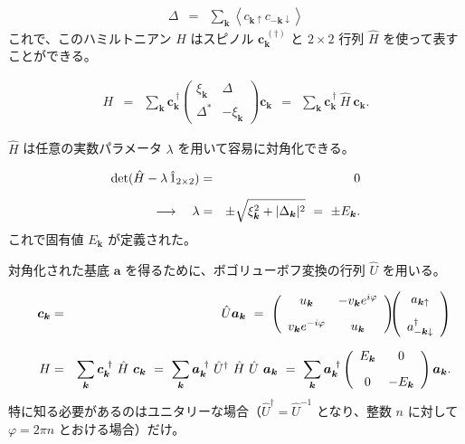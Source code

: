 \documentclass[uplatex,a4j,12pt,dvipdfmx]{jsarticle}
\begin{document}
\begin{eqnarray}
	\Delta
	&=&
	\sum_{\bm{k}}
	\left\langle
	c_{\bm{k} \uparrow}
	c_{-\bm{k} \downarrow}
	\right\rangle
\end{eqnarray}
%
これで、このハミルトニアン $H$ はスピノル $\bm{c}_{\bm{k}}^{\ (\dagger)}$ と $2 \times 2$ 行列 $\hat{H}$ を使って表すことができる。

\begin{eqnarray}
	H
	&=&
	\sum_{\bm{k}}
	\bm{c}^{\ \dagger}_{\bm{k}}
	\!\!
	\left(
	\begin{array}{cc}
			\xi_{\bm{k}} & \Delta         \\[3mm]
			\Delta^{*}    & -\xi_{\bm{k}}
		\end{array}
	\right)
	\!\!
	\bm{c}_{\bm{k}}
	\ \ = \ \
	\sum_{\bm{k}}
	\bm{c}^{\ \dagger}_{\bm{k}}
	\
	\hat{H}
	\
	\bm{c}_{\bm{k}}
	.
\end{eqnarray}
%

$\hat{H}$ は任意の実数パラメータ $\lambda$ を用いて容易に対角化できる。

\begin{eqnarray}
	{\rm det} ( \hat{H} - \lambda \ \! \hat{1}_{2 \times 2})
	&=&
	0
	\\[2mm]
	\longrightarrow
	\ \ \
	\lambda
	&=&
	\pm
	\sqrt{ \xi_{\bm{k}}^{2} + | \Delta_{\bm{k}} |^{2} }
	\ = \
	\pm E_{\bm{k}}
	.
\end{eqnarray}
%
これで固有値 $E_{\bm{k}}$ が定義された。

対角化された基底 $\bm{a}$ を得るために、ボゴリューボフ変換の行列 $\hat{U}$ を用いる。

\begin{eqnarray}
	\bm{c}_{\bm{k}}
	&=&
	\hat{U}
	\bm{a}_{\bm{k}}
	\ = \
	\left(
	\begin{array}{cc}
			u_{\bm{k}}                 & - v_{\bm{k}} e^{i \varphi}
			\\[3mm]
			v_{\bm{k}} e^{- i \varphi} & u_{\bm{k}}
		\end{array}
	\right)
	\!\!\!
	\left(
	\begin{array}{c}
			a_{\bm{k} \uparrow} \\[3mm]
			a_{-\bm{k} \downarrow}^{\dagger}
		\end{array}
	\right)
	\\[2mm]
	\hspace{5mm}
	H
	&=&
	\sum_{\bm{k}}
	\bm{c}^{\ \dagger}_{\bm{k}}
	\
	\hat{H}
	\
	\bm{c}_{\bm{k}}
	\ = \
	\sum_{\bm{k}}
	\bm{a}^{\ \dagger}_{\bm{k}}
	\
	\hat{U}^{\dagger}
	\
	\hat{H}
	\
	\hat{U}
	\
	\bm{a}_{\bm{k}}
	\ = \
	\sum_{\bm{k}}
	\bm{a}^{\ \dagger}_{\bm{k}}
	\left(
	\begin{array}{cc}
			E_{\bm{k}} & 0
			\\[3mm]
			0           & - E_{\bm{k}}
		\end{array}
	\right)
	\bm{a}_{\bm{k}}
	.
\end{eqnarray}
%
特に知る必要があるのはユニタリーな場合（$\hat{U}^{\dagger} = \hat{U}^{-1}$ となり、整数 $n$ に対して $\varphi=2 \pi n$ とおける場合）だけ。
\end{document}
